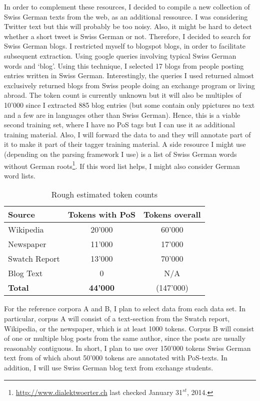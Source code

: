 \documentclass[11pt,letterpaper]{article}
\begin{document}
In order to complement these resources, I decided to compile a new collection of Swiss German texts from the web, as an additional ressource. I was considering Twitter text but this will probably be too noisy. Also, it might be hard to detect whether a short tweet is Swiss German or not. Therefore, I decided to search for Swiss German blogs. I restricted myself to blogspot blogs, in order to facilitate subsequent extraction. Using google queries involving typical Swiss German words and `blog'. Using this technique, I selected 17 blogs from people posting entries written in Swiss German. Interestingly, the queries I used returned almost exclusively returned blogs from Swiss people doing an exchange program or living abroad. The token count is currently unknown but it will also be multiples of 10'000 since I extracted 885 blog entries (but some contain only ppictures no text and a few are in languages other than Swiss German). Hence, this is a viable second training set, where I have no PoS tags but I can use it as additional training material. Also, I will forward the data to \citet{AH14} and they will annotate part of it to make it part of their tagger training material. A side resource I might use (depending on the parsing framework I use) is a list of Swiss German words without German roots\footnote{\url{http://www.dialektwoerter.ch} last checked January 31$^{st}$, 2014.}. If this word list helps, I might also consider German word lists.

\begin{table}
\center
\begin{tabular}{ | l | c | c | }
   \hline
   \textbf{Source} & \textbf{Tokens with PoS} & \textbf{Tokens overall} \\ \hline
   Wikipedia & 20'000 & 60'000 \\
   Newspaper & 11'000 & 17'000 \\ 
   Swatch Report & 13'000 & 70'000 \\
   Blog Text & 0 & N/A \\ \hline
   \textbf{Total} & \textbf{44'000} & (147'000) \\ \hline
\end{tabular}
\caption{Rough estimated token counts}
\end{table}
For the reference corpora A and B, I plan to select data from each data set. In particular, corpus A will consist of a text-section from the Swatch report, Wikipedia, or the newspaper, which is at least 1000 tokens. Corpus B will consist of one or multiple blog posts from the same author, since the posts are usually reasonably contiguous. In short, I plan to use over 150'000 tokens Swiss German text from \cite{AH14} of which about 50'000 tokens are annotated with PoS-texts. In addition, I will use Swiss German blog text from exchange students.
\end{document}
